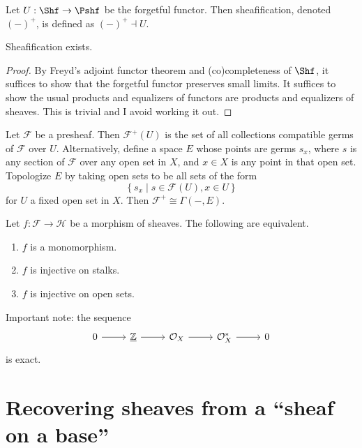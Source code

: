\begin{definition}\label{dfn:2-4-6}
	Let $U : \Shf \to \Pshf $ be the forgetful functor. Then sheafification, denoted $(-)^+$, is defined as $(-)^+\dashv U$.
\end{definition}
\begin{proposition}\label{prp:2-4-7}
	Sheafification exists.
\end{proposition}
\begin{proof}
	By Freyd's adjoint functor theorem and (co)completeness of $\Shf $, it suffices to show that the forgetful functor preserves small limits. It suffices to show the usual products and equalizers of functors are products and equalizers of sheaves. This is trivial and I avoid working it out.
\end{proof}

\begin{construction}
	Let $\mathcal{F} $ be a presheaf. Then $\mathcal{F} ^+(U)$ is the set of all collections compatible germs of $\mathcal{F} $ over $U$. Alternatively, define a space $E$ whose points are germs $s_x$, where $s$ is any section of $\mathcal{F} $ over any open set in $X$, and $x\in X$ is any point in that open set. Topologize $E$ by taking open sets to be all sets of the form
	\[
		\left\{ s_x \mid s\in \mathcal{F} (U),x\in U \right\} 
	\]
	for $U$ a fixed open set in $X$. Then $\mathcal{F} ^+ \cong \Gamma (-,E)$.
\end{construction}


\begin{exercise}
	Let $f : \mathcal{F}  \to \mathcal{H} $ be a morphism of sheaves. The following are equivalent.
	\begin{enumerate}
		\item $f$ is a monomorphism.
		\item $f$ is injective on stalks.
		\item $f$ is injective on open sets.
	\end{enumerate}
\end{exercise}

Important note: the sequence
\[\begin{tikzcd}[row sep = 2.5em, column sep = 2.5em]
0 \ar[r]  & \underline{\mathbb{Z} } \ar[r]  & \mathcal{O} _X \ar[r]  & \mathcal{O} _X^* \ar[r]  & 0
\end{tikzcd}\]
is exact.

\section{Recovering sheaves from a ``sheaf on a base''}

